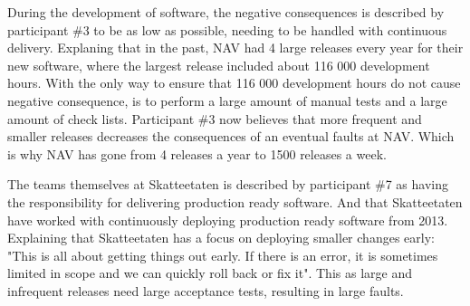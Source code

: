 During the development of software, the negative consequences is described by participant \#3 to be as low as possible, needing to be handled with continuous delivery. Explaning that in the past,  NAV had 4 large releases every year for their new software, where the largest release included about 116 000 development hours. With the only way to ensure that 116 000 development hours do not cause negative consequence, is to perform a large amount of manual tests and a large amount of check lists. Participant \#3 now believes that more frequent and smaller releases decreases the consequences of an eventual faults at NAV. Which is why NAV has gone from 4 releases a year to 1500 releases a week.


The teams themselves at Skatteetaten is described by participant \#7 as having the responsibility for delivering production ready software. And that Skatteetaten have worked with continuously deploying production ready software from 2013. Explaining that Skatteetaten has a focus on deploying smaller changes early: "This is all about getting things out early. If there is an error, it is sometimes limited in scope and we can quickly roll back or fix it". This as large and infrequent releases need large acceptance tests, resulting in large faults.

